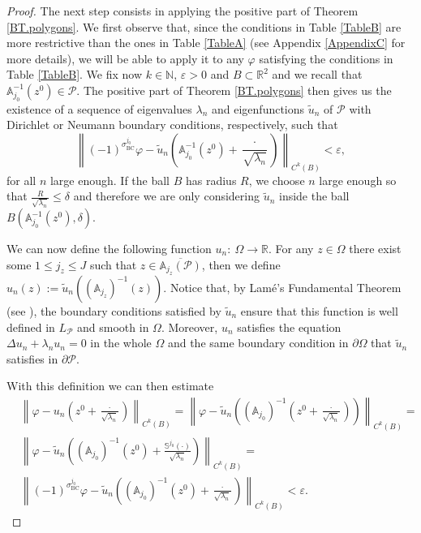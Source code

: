 \documentclass{amsart}
\theoremstyle{definition}
\theoremstyle{remark}
\newcommand{\ep}{\varepsilon}
\newcommand{\vp}{\varphi}
\def\RR{\mathbb{R}}
\renewcommand\leq\leqslant
\numberwithin{equation}{section}
\theoremstyle{definition}
\theoremstyle{remark}
\def\RR{\mathbb{R}}
\begin{document}
\begin{proof}
  The next step consists in applying the positive part of Theorem \ref{BT.polygons}. We first observe that, since the conditions in Table \ref{TableB} are more restrictive than the ones in Table \ref{TableA} (see Appendix \ref{AppendixC} for more details), we will be able to apply it to any $\varphi$ satisfying the conditions in Table \ref{TableB}. We fix now $k\in\mathbb{N}$, $\ep>0$ and $B\subset\RR^2$ and we recall that  $\mathbb{A}_{j_0}^{-1}\left(z^0\right)\in\mathcal{P}$. The positive part of Theorem \ref{BT.polygons} then gives us the existence of a sequence of eigenvalues $\lambda_n$ and eigenfunctions $\tilde{u}_{n}$ of $\mathcal{P}$ with Dirichlet or Neumann boundary conditions, respectively, such that \begin{equation}
		\left\|\left(-1\right)^{\sigma^{j_0}_\mathrm{BC}}\vp-\tilde{u}_{n}\left(\mathbb{A}_{j_0}^{-1}\left(z^0\right)+\frac{\cdot}{\sqrt{\lambda_n}}\right)\right\|_{C^k(B)}<\ep,
	\end{equation}for all $n$ large enough.
	If the ball $B$ has radius $R$, we choose $n$ large enough so that $\frac{R}{\sqrt{\lambda_n}}\leq \delta$ and therefore we are only considering $\tilde{u}_{n}$ inside the ball $B\left(\mathbb{A}_{j_0}^{-1}\left(z^0\right),\delta\right)$. 
	
	We can now define the following function $	u_{n}:\ \Omega\rightarrow\mathbb{R}$. For any $z\in\Omega$ there exist some $1\leq j_z\leq J$ such that $z\in\overline{\mathbb{A}_{j_z}\left(\mathcal{P}\right)}$, then we define $u_n(z):=\tilde{u}_{n}\left(\left(\mathbb{A}_{j_z}\right)^{-1}\left(z\right)\right).$ Notice that, by Lamé's Fundamental Theorem (see \cite[Theorem 1]{trigIV}), the boundary conditions satisfied by $\tilde{u}_n$ ensure that this function is well defined in $L_\mathcal{P}$ and smooth in $\Omega$. Moreover, $u_n$ satisfies the equation $\Delta u_n+\lambda_n u_n=0$ in the whole $\Omega$ and the same boundary condition in $\partial\Omega$ that $\tilde{u}_n$ satisfies in $\partial\mathcal{P}$.
		
		  With this definition we can then estimate \begin{equation}
		\begin{aligned}
			&\left\|\vp-u_{n}\left(z^0+\frac{\cdot}{\sqrt{\lambda_n}}\right)\right\|_{C^k(B)}=	\left\|\vp-\tilde{u}_{n}\left(\left(\mathbb{A}_{j_0}\right)^{-1}\left(z^0+\frac{\cdot}{\sqrt{\lambda_n}}\right)\right)\right\|_{C^k(B)}=\\&\left\|\vp-\tilde{u}_{n}\left(\left(\mathbb{A}_{j_0}\right)^{-1}\left(z^0\right)+\frac{\mathbb{S}^{j_0}\left(\cdot\right)}{\sqrt{\lambda_n}}\right)\right\|_{C^k(B)}=\\&\left\|\left(-1\right)^{\sigma^{j_0}_\mathrm{BC}}\vp-\tilde{u}_{n}\left(\left(\mathbb{A}_{j_0}\right)^{-1}\left(z^0\right)+\frac{\cdot}{\sqrt{\lambda_n}}\right)\right\|_{C^k(B)}<\ep.
		\end{aligned}
	\end{equation}
	

\end{proof}
\end{document}
